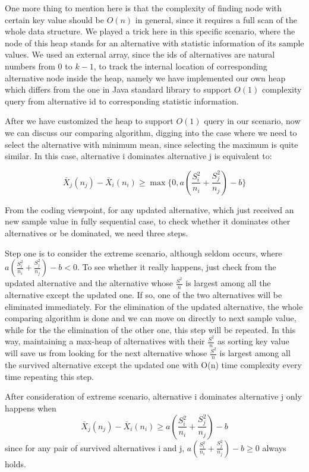 One more thing to mention here is that the complexity of finding node with certain key value should be $O(n)$ in general, since it requires a full scan of the whole data structure. We played a trick here in this specific scenario, where the node of this heap stands for an alternative with statistic information of its sample values. We used an external array, since the ids of alternatives are natural numbers from $0$ to $k - 1$, to track the internal location of corresponding alternative node inside the heap, namely we have implemented our own heap which differs from the one in Java standard library to support $O(1)$ complexity query from alternative id to corresponding statistic information.

After we have customized the heap to support $O(1)$ query in our scenario, now we can discuss our comparing algorithm, digging into the case where we need to select the alternative with minimum mean, since selecting the maximum is quite similar. In this case, alternative i dominates alternative j is equivalent to:

$$ \bar{X}_j(n_j)-\bar{X}_i(n_i) \ge \max\{0,a(\frac{S_i^2}{n_i}+\frac{S_j^2}{n_j}) - b\} $$

From the coding viewpoint, for any updated alternative, which just received an new sample value in fully sequential case, to check whether it dominates other alternatives or be dominated, we need three steps.

Step one is to consider the extreme scenario, although seldom occurs, where $a(\frac{S_i^2}{n_i}+\frac{S_j^2}{n_j}) - b < 0$. To see whether it really happens, just check from the updated alternative and the alternative whose $\frac{S^2}{n}$ is largest among all the alternative except the updated one. If so, one of the two alternatives will be eliminated immediately. For the elimination of the updated alternative, the whole comparing algorithm is done and we can move on directly to next sample value, while for the the elimination of the other one, this step will be repeated. In this way, maintaining a max-heap of alternatives with their $\frac{S^2}{n}$ as sorting key value will save us from looking for the next alternative whose $\frac{S^2}{n}$ is largest among all the survived alternative except the updated one with O(n) time complexity every time repeating this step.

After consideration of extreme scenario, alternative i dominates alternative j only happens when
$$ \bar{X}_j(n_j)-\bar{X}_i(n_i) \ge a(\frac{S_i^2}{n_i}+\frac{S_j^2}{n_j}) - b $$
since for any pair of survived alternatives i and j, $a(\frac{S_i^2}{n_i}+\frac{S_j^2}{n_j}) - b \ge 0$ always holds.

